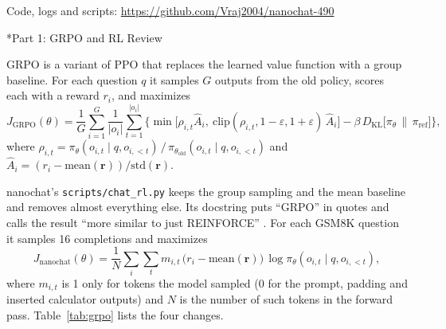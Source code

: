 \documentclass[11pt]{article}
\title{\vspace{-3em}{CSC490 Assignment A4: RL-ing nanochat\vspace{-1em}}}
\author{
  Prithvi Seran (1009973343) \and
  Vraj Shah (1009102695) \and
  Tyseer Toufiq (1009364064) \and
  Joshua Crisologo (1009860438)
}
\date{}
\makeatletter
\renewcommand\section{\@startsection{section}{1}{\z@}{1.2em}{0.5em}{\large\bfseries}}
\newcommand{\code}[1]{\texttt{#1}}
\makeatother
\begin{document}
\maketitle
\vspace{-2.5em}
\begin{center}
\small Code, logs and scripts: \url{https://github.com/Vraj2004/nanochat-490}
\end{center}

\section*{Part 1: GRPO and RL Review}

GRPO \cite{grpo} is a variant of PPO \cite{ppo} that replaces the learned value function with a group baseline. For each question $q$ it samples $G$ outputs from the old policy, scores each with a reward $r_i$, and maximizes
\begin{equation}
J_{\text{GRPO}}(\theta) = \frac{1}{G}\sum_{i=1}^{G}\frac{1}{|o_i|}\sum_{t=1}^{|o_i|}
\Big\{\min\!\big[\rho_{i,t}\hat{A}_i,\ \text{clip}(\rho_{i,t},1-\varepsilon,1+\varepsilon)\,\hat{A}_i\big]
-\beta\, D_{\text{KL}}\big[\pi_\theta\,\|\,\pi_{\text{ref}}\big]\Big\},
\label{eq:grpo}
\end{equation}
where $\rho_{i,t} = \pi_\theta(o_{i,t}\mid q,o_{i,<t})\,/\,\pi_{\theta_{\text{old}}}(o_{i,t}\mid q,o_{i,<t})$ and $\hat{A}_i = (r_i-\text{mean}(\mathbf{r}))/\text{std}(\mathbf{r})$.

nanochat's \code{scripts/chat\_rl.py} \cite{nanochat} keeps the group sampling and the mean baseline and removes almost everything else. Its docstring puts ``GRPO'' in quotes and calls the result ``more similar to just REINFORCE'' \cite{reinforce}. For each GSM8K \cite{gsm8k} question it samples 16 completions and maximizes
\begin{equation}
J_{\text{nanochat}}(\theta) = \frac{1}{N}\sum_{i}\sum_{t} m_{i,t}\,\big(r_i-\text{mean}(\mathbf{r})\big)\,\log\pi_\theta(o_{i,t}\mid q,o_{i,<t}),
\label{eq:nanochat}
\end{equation}
where $m_{i,t}$ is 1 only for tokens the model sampled (0 for the prompt, padding and inserted calculator outputs) and $N$ is the number of such tokens in the forward pass. Table~\ref{tab:grpo} lists the four changes.
\end{document}
